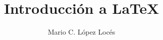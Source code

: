 \documentclass{article}
\begin{document}
	\author{Mario C. López Locés}
	\title{Introducción a \LaTeX}
	\date{}
	\tableofcontents
	\maketitle

%
\end{document}
